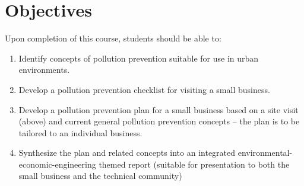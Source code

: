 \documentclass[12pt]{article}
\begin{document}
\section*{Objectives}
Upon completion of this course, students should be able to:
\begin{enumerate}
\item Identify concepts of pollution prevention suitable for use in urban environments.
\item Develop a pollution prevention checklist for visiting a small business.
\item Develop a pollution prevention plan for a small business based on a site visit (above) and current general pollution prevention concepts -- the plan is to be tailored to an individual business.
\item Synthesize the plan and related concepts into an integrated environmental-economic-engineering themed report (suitable for presentation to both the small business and the technical community)
\end{enumerate}
\clearpage
\end{document}
